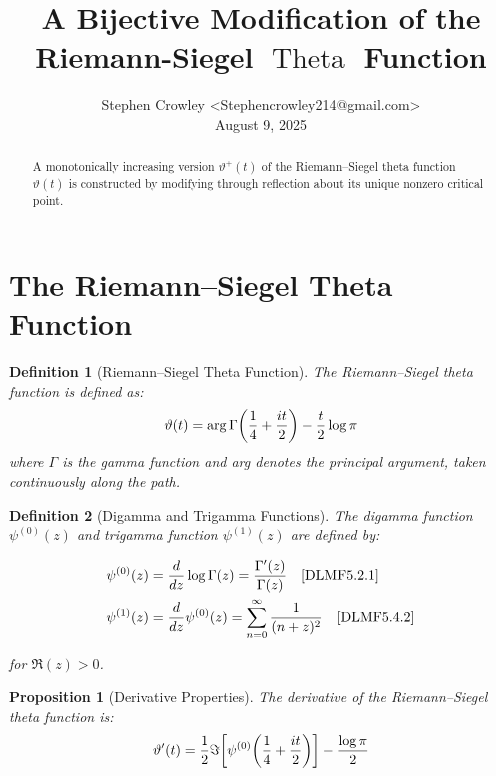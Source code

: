 \documentclass{article}
\newcommand{\tmaffiliation}[1]{\\ #1}
\newcommand{\tmop}[1]{\ensuremath{\operatorname{#1}}}
\newtheorem{definition}{Definition}
\newtheorem{proposition}{Proposition}
\begin{document}
\title{A Bijective Modification of the Riemann-Siegel $\tmop{Theta}$ Function}

\author{
  Stephen Crowley <Stephencrowley214@gmail.com>
  \tmaffiliation{August 9, 2025}
}

\maketitle

\begin{abstract}
  A monotonically increasing version $\vartheta^+ (t)$ of the Riemann--Siegel
  theta function $\vartheta (t)$ is constructed by modifying through
  reflection about its unique nonzero critical point. {\cdot}
\end{abstract}

{\tableofcontents}

\section{The Riemann--Siegel Theta Function}

\begin{definition}
  [Riemann--Siegel Theta Function]\label{def:theta} The Riemann--Siegel theta
  function is defined as:
  \begin{equation}
    \vartheta (t) = \arg \Gamma \hspace{-0.17em} \left( \frac{1}{4} +
    \frac{it}{2} \right) - \frac{t}{2} \log \pi
  \end{equation}
  where $\Gamma$ is the gamma function and arg denotes the principal argument,
  taken continuously along the path.
\end{definition}

\begin{definition}
  [Digamma and Trigamma Functions]\label{def:psi} The digamma function
  $\psi^{(0)} (z)$ and trigamma function $\psi^{(1)} (z)$ are defined by:
  
  \begin{align}
    \psi^{(0)} (z) & = \frac{d}{dz} \log \Gamma (z) = \frac{\Gamma'
    (z)}{\Gamma (z)} \quad \text{{\cite{DLMF5.2.1}}} \\
    \psi^{(1)} (z) & = \frac{d}{dz} \psi^{(0)} (z) = \sum_{n = 0}^{\infty}
    \frac{1}{(n + z)^2} \quad \text{{\cite{DLMF5.4.2}}} 
  \end{align}
  
  for $\Re (z) > 0$.
\end{definition}

\begin{proposition}
  [Derivative Properties]\label{prop:derivative} The derivative of the
  Riemann--Siegel theta function is:
  \begin{equation}
    \vartheta' (t) = \frac{1}{2} \Im \hspace{-0.17em} \left[ \psi^{(0)} 
    \hspace{-0.17em} \left( \frac{1}{4} + \frac{it}{2} \right) \right] -
    \frac{\log \pi}{2}
  \end{equation}
\end{proposition}
\end{document}
